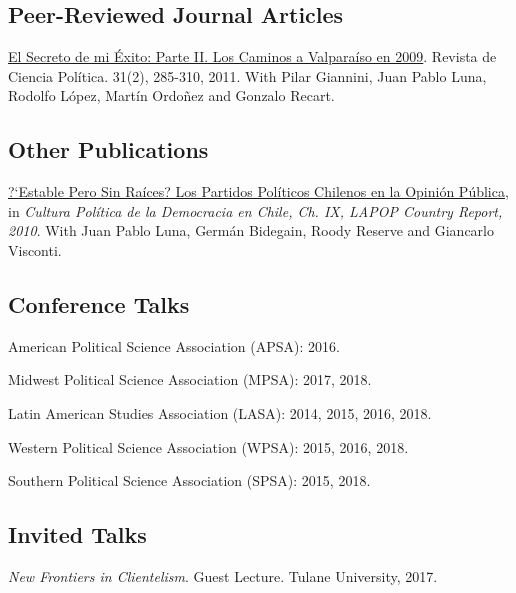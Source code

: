 \documentclass[letterpaper]{article}
\renewenvironment{itemize}{
  \begin{list}{}{
    \setlength{\leftmargin}{1.5em}
  }
}{
  \end{list}
}
\begin{document}
\subsection*{Peer-Reviewed Journal Articles}

\begin{itemize}
  \item[$\bullet$] \href{http://www.revistacienciapolitica.cl/rcp/wp-content/uploads/2013/09/07_vol_31_2.pdf}{El Secreto de mi \'Exito: Parte II. Los Caminos a Valpara\'iso en 2009}. Revista de Ciencia Pol\'itica. 31(2), 285-310, 2011. With Pilar Giannini, Juan Pablo Luna, Rodolfo L\'opez, Mart\'in Ordo\~nez and Gonzalo Recart.
\end{itemize}


\subsection*{Other Publications}

\begin{itemize}
\item[$\bullet$] \href{http://www.vanderbilt.edu/lapop/chile/Chile-2010-cultura-politica.pdf}{?`Estable Pero Sin Ra\'ices? Los Partidos Pol\'iticos Chilenos en la Opini\'on P\'ublica}, in \emph{Cultura Pol\'itica de la Democracia en Chile, Ch. IX, LAPOP Country Report, 2010}. With Juan Pablo Luna, Germ\'an Bidegain, Roody Reserve and Giancarlo Visconti.
\end{itemize}

\subsection*{Conference Talks}

\begin{itemize}
\item American Political Science Association (APSA): 2016.
\item Midwest Political Science Association (MPSA): 2017, 2018.
\item Latin American Studies Association (LASA): 2014, 2015, 2016, 2018.
\item Western Political Science Association (WPSA): 2015, 2016, 2018.
\item Southern Political Science Association (SPSA): 2015, 2018.
\end{itemize}


\subsection*{Invited Talks}
\begin{itemize}
\item \emph{New Frontiers in Clientelism}. Guest Lecture. Tulane University, 2017.
\end{itemize}
\end{document}
